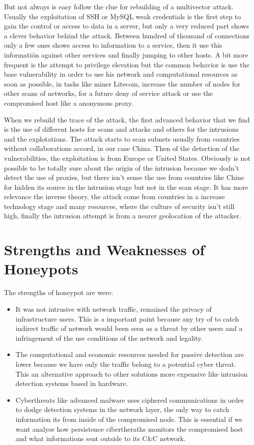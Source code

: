 \documentclass[a4paper]{llncs}
\begin{document}
	But not always is easy follow the clue for rebuilding of a multivector attack. Usually the exploitation of SSH or MySQL weak credentials is the first step to gain the control or access to data in a server, but only a very reduced part shows a clever behavior behind the attack. Between hundred of thousand of connections only a few ones shows access to information to a service, then it use this informatión against other services and finally jumping to other hosts. A bit more frequent is the attempt to privilege elevation but the common behavior is use the base vulnerability in order to use his network and computational resources as soon as possible, in tasks like miner Litecoin\cite{litecoin}, increase the number of nodes for other scans of networks, for a future deny of service attack or use the compromised host like a anonymous proxy.
	
	When we rebuild the trace of the attack, the first advanced behavior that we find is the use of different hosts for scans and attacks and others for the intrusions and the explotations. The attack starts to scan subnets usually from countries without collaborations accord, in our case China. Then of the detection of the vulnerabilities, the exploitation is from Europe or United States. Obviously is not possible to be totally sure about the origin of the intrusion because we dodn't detect the use of proxies, but there isn't sense the use from countries like Chine for hidden its source in the intrusion stage but not in the scan stage. It has more relevance the inverse theory, the attack come from countries in a increase technology stage and many resources, where the culture of security isn't still high, finally the intrusion attempt is from a nearer geolocation of the attacker.
	
	
	\section{Strengths and Weaknesses of Honeypots}
	The strengths of honeypot are were:
	\begin{itemize}
		\item It was not intrusive with network traffic, remained the privacy of infrastructure users. This is a important point because any try of to catch indirect traffic of network would been seen as a threat by other users and a infringement of the use conditions of the network and legality.
		\item The computational and economic resources needed for passive detection are lower because we have only the traffic belong to a potential cyber threat. This an alternative approach to other solutions more expensive like intrusion detection systems based in hardware.
		\item Cyberthreats like advanced malware uses ciphered communications in order to dodge detection systems in the network layer, the only way to catch information its from inside of the compromised node. This is essential if we want analyse how persistence cibertheraths monitors the compromised host and what informations sent outside to its C\&C network.
	\end{itemize}
	
\end{document}
